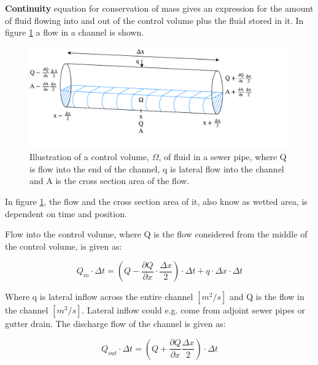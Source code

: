 \textbf{Continuity} equation for conservation of mass gives an expression for the amount of fluid flowing into and out of the control volume plus the fluid stored in it. 
In figure \ref{fig:firkant_kloak} a flow in a channel is shown. 

\begin{figure}[H]
\centering
\includegraphics[width=1.1\textwidth]{report/modeling/pictures/continuity_open_channel.pdf}
\caption{Illustration of a control volume, $\Omega$, of fluid in a sewer pipe, where Q is flow into the end of the channel, q is lateral flow into the channel and A is the cross section area of the flow.}
\label{fig:firkant_kloak}
\end{figure}

In figure \ref{fig:firkant_kloak}, the flow and the cross section area of it, also know as wetted area, is dependent on time and position. %

Flow into the control volume, where Q is the flow considered from the middle of the control volume, is given as:

\begin{equation}
Q_{in} \cdot \Delta t =	\left(Q - \frac{\partial Q}{\partial x}\cdot \frac{\Delta x}{2}\right) \cdot \Delta t + q \cdot \Delta x \cdot \Delta t
\label{flowin_saintbernard}
\end{equation}

Where q is lateral inflow across the entire channel $\left[ m^2/s \right]$ and Q is the flow in the channel $\left[m^3/s\right]$. Lateral inflow could e.g. come from adjoint sewer pipes or gutter drain.
The discharge flow of the channel is given as:

\begin{equation}
Q_{out} \cdot \Delta t =\left(Q + \frac{\partial Q}{ \partial x} \frac{\Delta x}{2} \right) \cdot \Delta t 
\label{flowout_saintbernard}
\end{equation}

